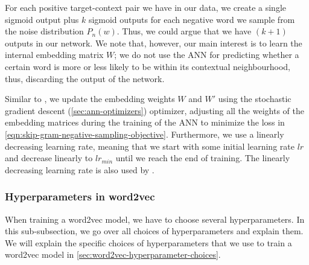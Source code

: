 For each positive target-context pair we have in our data, we create a single sigmoid output plus $k$ sigmoid outputs for each negative word we sample from the noise distribution $P_n(w)$. Thus, we could argue that we have $(k + 1)$ outputs in our network.  We note that, however, our main interest is to learn the internal embedding matrix $W$; we do not use the ANN for predicting whether a certain word is more or less likely to be within its contextual neighbourhood, thus, discarding the output of the network.

Similar to \cite{mikolov2013a}, we update the embedding weights $W$ and $W'$ using the stochastic gradient descent (\cref{sec:ann-optimizers}) optimizer, adjusting all the weights of the embedding matrices during the training of the ANN to minimize the loss in \cref{eqn:skip-gram-negative-sampling-objective}. Furthermore, we use a linearly decreasing learning rate, meaning that we start with some initial learning rate $lr$ and decrease linearly to $lr_{min}$ until we reach the end of training. The linearly decreasing learning rate is also used by \cite{mikolov2013a}.

\subsubsection{Hyperparameters in word2vec}
When training a word2vec model, we have to choose several hyperparameters. In this sub-subsection, we go over all choices of hyperparameters and explain them. We will explain the specific choices of hyperparameters that we use to train a word2vec model in \cref{sec:word2vec-hyperparameter-choices}.

